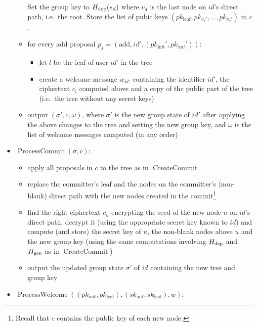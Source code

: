 \begin{definition}
\begin{itemize}
\begin{itemize}
\begin{itemize}
			            \end{itemize}
			            Set the group key to $H_\mathrm{dep}(s_d)$ where $v_d$ is the last node on $id$'s direct path, i.e.\ the root. Store the list of pubic keys $(pk_{\mathrm{leaf}}, pk_{v_1'}, \ldots, pk_{v_d'})$ in $c$.
			      \item for every add proposal $p_j = (\mathrm{add}, id', (pk_{\mathrm{init}}', pk_{\mathrm{leaf}}'))$:
			            \begin{itemize}
				            \item let $l$ be the leaf of user $id'$ in the tree
				            \item create a welcome message $w_{id'}$ containing the identifier $id'$, the ciphertext $c_l$ computed above and a copy of the public part of the tree (i.e.\ the tree without any secret keys)
			            \end{itemize}
			      \item output $(\sigma', c, \omega)$, where $\sigma'$ is the new group state of $id'$ after applying the above changes to the tree and setting the new group key, and $\omega$ is the list of welcome messages computed (in any order)
		      \end{itemize}
		\item $\operatorname{ProcessCommit}(\sigma, c)$:
		      \begin{itemize}
			      \item apply all proposals in $c$ to the tree as in $\operatorname{CreateCommit}$
			      \item replace the committer's leaf and the nodes on the committer's (non-blank) direct path with the new nodes created in the commit\footnote{Recall that $c$ contains the public key of each new node.}
			      \item find the right ciphertext $c_u$ encrypting the seed of the new node $u$ on $id$'s direct path, decrypt it (using the appropriate secret key known to $id$) and compute (and store) the secret key of $u$, the non-blank nodes above $u$ and the new group key (using the same computations involving $H_\mathrm{dep}$ and $H_\mathrm{gen}$ as in $\operatorname{CreateCommit}$)
			      \item output the updated group state $\sigma'$ of $id$ containing the new tree and group key
		      \end{itemize}
		\item $\operatorname{ProcessWelcome}((pk_{\mathrm{init}}, pk_{\mathrm{leaf}}), (sk_{\mathrm{init}}, sk_{\mathrm{leaf}}), w)$:
		      \begin{itemize}

\end{itemize}
\end{itemize}
\end{definition}
